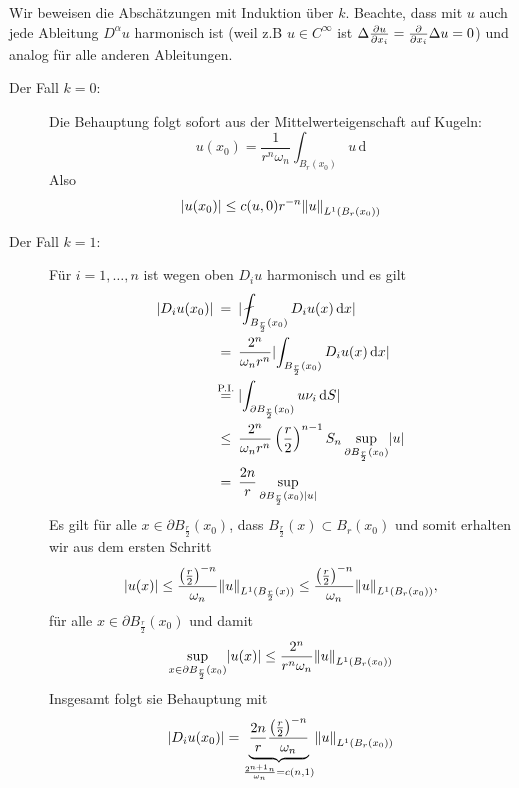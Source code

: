 \begin{beweis}
	Wir beweisen die Abschätzungen mit Induktion über $k$. 
	Beachte, dass mit $u$ auch jede Ableitung $D^{\alpha}u$ harmonisch ist (weil z.B $u \in C^{\infty}$ ist $\Delta \frac{{\partial u}}{{\partial x_i}} = \frac{{\partial }}{{\partial x_i}} \Delta u = 0$) 
	und analog für alle anderen Ableitungen.
	\begin{description}
		\item[Der Fall $k=0$:] Die Behauptung folgt sofort aus der Mittelwerteigenschaft auf Kugeln:
		\begin{equation}
			u(x_0) = \frac{1}{r^n \omega_n} \int_{B_r(x_0)}^{}u \,\mathrm{d}
		\end{equation} 
		Also 
		\begin{equation}
			\abs{u(x_0)} \leq c(u,0)r^{-n} \norm{u}_{L^1(B_r(x_0))}
		\end{equation}
		\item[Der Fall $k=1$:] Für $i=1,\dots,n$ ist wegen oben $D_iu$ harmonisch und es gilt
		\begin{align*}
			\abs{D_i u(x_0)} & \stackrel{\hphantom{\text{P.I.}}}{=} \abs{ \fint_{B_{\frac{r}{2}}(x_0)}^{} D_iu(x) \,\mathrm{d}x} \\
			& \stackrel{\hphantom{\text{P.I.}}}{=} \frac{2^n}{\omega_n r^n} \abs{\int_{B_{\frac{r}{2}}(x_0)}^{}D_i u(x) \,\mathrm{d}x} \\
			& \stackrel{\text{P.I.}}{=} \abs{\int_{ \partial B_{\frac{r}{2}}(x_0)}^{} u \nu_i\,\mathrm{d}S} \\
			& \stackrel{\hphantom{\text{P.I.}}}{\leq} \frac{2^n}{\omega_n r^n} \left( \frac{r}{2} \right)^{n-1}S_n \sup_{\partial B_{\frac{r}{2}}(x_0)}\abs{u} \\
			& \stackrel{\hphantom{\text{P.I.}}}{=} \frac{2n}{r} \sup_{\partial B_{\frac{r}{2}}(x_0)\abs{u}}
		\end{align*}
		Es gilt für alle $x \in \partial B_{\frac{r}{2}}(x_0)$, dass $B_{\frac{r}{2}}(x) \subset B_r(x_0)$ und somit erhalten wir aus dem ersten Schritt
		\begin{equation}
			\abs{u(x)} \leq \frac{\left( \frac{r}{2} \right)^{-n}}{\omega_n} \norm{u}_{L^1(B_{\frac{r}{2}}(x))} 
			\leq \frac{\left( \frac{r}{2} \right)^{-n}}{\omega_n} \norm{u}_{L^1(B_r(x_0))},
		\end{equation}
		für alle $x \in \partial B_{\frac{r}{2}}(x_0)$ und damit
		\begin{equation}
			\sup_{x \in \partial B_{\frac{r}{2}}(x_0)}\abs{u(x)} \leq \frac{2^n}{r^n \omega_n} \norm{u}_{L^1(B_r(x_0))}
		\end{equation}
		Insgesamt folgt sie Behauptung mit
		\begin{equation}
			\abs{D_iu(x_0)}
			 = \underset{\frac{2^{n+1}n}{\omega_n}= c(n,1)}{\underbrace{\frac{2n}{r} \frac{\left( \frac{r}{2} \right)^{-n}}{\omega_n}}} \norm{u}_{L^1(B_r(x_0))}
		\end{equation}
	\end{description}
\end{beweis}
\cleardoubleoddemptypage
{}
\setcounter{page}{1}

